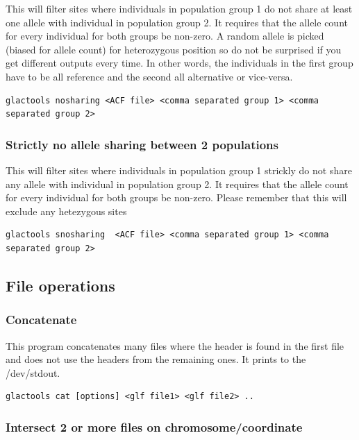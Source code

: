 \documentclass[a4paper]{article}
\begin{document}
\noindent This will filter sites where individuals in population group 1 do not share at least one allele with individual in population group 2.
It requires that the allele count for every individual for both groups be non-zero.
A random allele is picked (biased for allele count) for heterozygous position so do not be surprised if you get different outputs every time.
In other words, the individuals in the first group have to be all reference and the second all alternative or vice-versa.

\tiny
\begin{lstlisting}
glactools nosharing <ACF file> <comma separated group 1> <comma separated group 2>
\end{lstlisting}
\normalsize

\subsubsection{Strictly no allele sharing between 2 populations}
\noindent This will filter sites where individuals in population group 1 strickly do not share any allele with individual in population group 2.
It requires that the allele count for every individual for both groups be non-zero.
Please remember that this will exclude any hetezygous sites

\small
\begin{lstlisting}
glactools snosharing  <ACF file> <comma separated group 1> <comma separated group 2>
\end{lstlisting}
\normalsize



\subsection{File operations}

\subsubsection{Concatenate}
\noindent This program concatenates many files where the header is found in the first file and does not use the headers from the remaining ones. It prints to the /dev/stdout.

\begin{lstlisting}
glactools cat [options] <glf file1> <glf file2> .. 
\end{lstlisting}

\subsubsection{Intersect 2 or more files on chromosome/coordinate}
\end{document}
